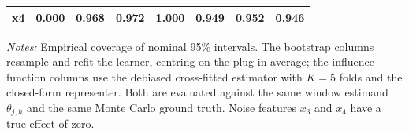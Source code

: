 \begin{table}[htbp]
\begin{threeparttable}
\begin{tabular}{lrrrrrrr}
\quad x4 & 0.000 & 0.968 & 0.972 & 1.000 & 0.949 & 0.952 & 0.946 \\
\bottomrule
\end{tabular}
\begin{tablenotes}
\footnotesize
\item \textit{Notes:} Empirical coverage of nominal 95\% intervals. The bootstrap columns resample and refit the learner, centring on the plug-in average; the influence-function columns use the debiased cross-fitted estimator with $K=5$ folds and the closed-form representer. Both are evaluated against the same window estimand $\theta_{j,h}$ and the same Monte Carlo ground truth. Noise features $x_3$ and $x_4$ have a true effect of zero.
\end{tablenotes}
\end{threeparttable}
\end{table}